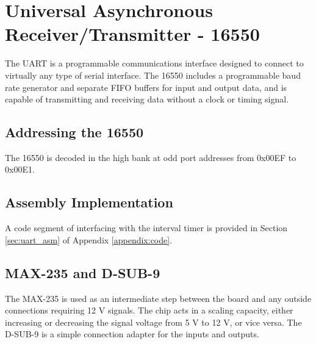 \section{Universal Asynchronous Receiver/Transmitter  - 16550}
The UART is a programmable communications interface designed to connect to virtually any type of serial interface. The 16550 includes a programmable baud rate generator and separate FIFO buffers for input and output data, and is capable of transmitting and receiving data without a clock or timing signal.

    \subsection{Addressing the 16550}
    The 16550 is decoded in the high bank at odd port addresses from 0x00EF to 0x00E1.

    \subsection{Assembly Implementation}
    A code segment of interfacing with the interval timer is provided in Section \ref{sec:uart_asm} of Appendix \ref{appendix:code}.

    \subsection{MAX-235 and D-SUB-9}
    The MAX-235 is used as an intermediate step between the board and any outside connections requiring 12 V signals. The chip acts in a scaling capacity, either increasing or decreasing the signal voltage from 5 V to 12 V, or vice versa.\n
    The D-SUB-9 is a simple connection adapter for the inputs and outputs.
